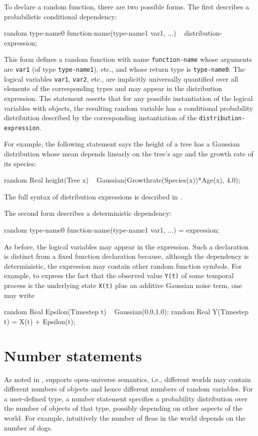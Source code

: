 \documentclass[12pt]{article}
\begin{document}
To declare a random function, there are two possible forms. The first describes a probabilistic
conditional dependency:
\begin{blogcode}
random type-name0 function-name(type-name1 var1, ...) ~ distribution-expression;
\end{blogcode}
This form defines a random function with name \texttt{function-name} whose arguments are {\tt var1} (of type {\tt type-name1}), etc.,
and whose return type is \texttt{type-name0}. The logical variables {\tt var1}, {\tt var2}, etc., are implicitly universally quantified over
all elements of the corresponding types and may appear in the distribution expression. The statement asserts that for any possible instantiation of the
logical variables with objects, the resulting random variable has a conditional probability distribution
described by the corresponding instantiation of the {\tt distribution-expression}.

For example, the following statement says the height of a tree has a Gaussian distribution
whose mean depends linearly on the tree's age and the growth rate of its species:
\begin{blogcode}
random Real height(Tree x) ~ Gaussian(Growthrate(Species(x))*Age(x), 4.0);
\end{blogcode}
The full syntax of distribution expressions is described in .

The second form describes a deterministic dependency:
\begin{blogcode}
random type-name0 function-name(type-name1 var1, ...) = expression;
\end{blogcode}
As before, the logical variables may appear in the expression.
Such a declaration is distinct from a fixed function declaration because, although the dependency is deterministic,
the expression may contain other random function symbols. For example, 
to express the fact that the observed value {\tt Y(t)} of some temporal process 
is the underlying state {\tt X(t)} plus an additive Gaussian noise term, one may write
\begin{blogcode}
random Real Epsilon(Timestep t) ~ Gaussian(0.0,1.0);
random Real Y(Timestep t) = X(t) + Epsilon(t);
\end{blogcode}




\section{Number statements}\label{number-section}
As noted in , \bl supports open-universe semantics, i.e., different worlds may contain different numbers of objects and hence different numbers of random variables.
For a user-defined type, a number statement specifies a probability distribution over the number of objects of that type, possibly depending
on other aspects of the world. For example, intuitively the number of fleas in the world depends on the number of dogs.
\end{document}
